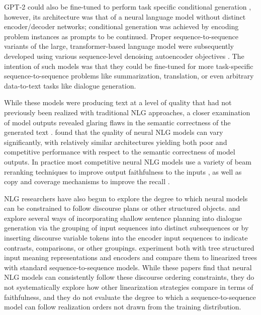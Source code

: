 GPT-2 could also be fine-tuned to perform task specific conditional generation
\citep{ziegler2019,golovanov2019}, however, its architecture was that of a
neural language model without distinct encoder/decoder networks; conditional
generation was achieved by encoding problem instances as prompts to be
continued.  Proper sequence-to-sequence variants of the large,
transformer-based language model were subsequently developed using various
sequence-level denoising autoencoder objectives \citep{zhang2019,raffel2020,
lewis2020}.  The intention of such models was that they could be fine-tuned for
more task-specific sequence-to-sequence problems like summarization,
translation, or even arbitrary data-to-text tasks like dialogue generation.

While these models were producing text at a level of quality that had not
previously been realized with traditional NLG approaches, a closer examination
of model outputs revealed glaring flaws in the semantic correctness of the
generated text \citep{kryscinski2019,kryscinski2020,maynez2020}.
\cite{dusek2020} found that the quality of neural NLG models can vary
significantly, with relatively similar architectures yielding both poor and
competitive performance with respect to the semantic correctness of model
outputs. In practice most competitive neural NLG models use a variety of beam
reranking techniques to improve output faithfulness to the inputs
\citep{dusek2016,juraska2018,wen2015}, as well as copy and coverage mechanisms
to improve the recall \citep{see2017,elder2018}.

NLG researchers have also begun to explore the degree to which neural models
can be constrained to follow discourse plans or other structured objects.
\citet{nayak2017} and \citet{reed2018} explore several ways of incorporating
shallow sentence planning into dialogue generation via the  grouping of input
sequences into distinct subsequences or by inserting discourse variable tokens
into the encoder input sequences to indicate contrasts, comparisons, or other
groupings.  \citet{balakrishnan2019} experiment both with tree structured input
meaning representations  and encoders and compare them to linearized trees with
standard sequence-to-sequence models.  While these papers find that neural NLG
models can consistently follow these discourse ordering constraints, they do
not  systematically explore how other linearization strategies compare in terms
of faithfulness, and they do not evaluate the degree to which a
sequence-to-sequence model can follow realization orders not drawn from the
training distribution.

